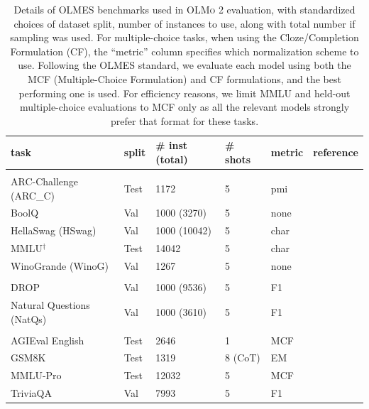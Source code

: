 \documentclass[table]{ai2style/ai2}
\newcommand{\olmotoo}{\textsc{OLMo 2}\xspace}
\begin{document}
\begin{table}[h]
  \centering

\begin{small}
\begin{tabular}{llllll}
\toprule
\bf{task} & \bf{split} & \bf{\# inst (total)} & \bf{\# shots} & \bf{metric} & \bf{reference}\\
\midrule
\rowcolor{midgrey}\multicolumn{6}{c}{\textbf{\textit{Multiple-choice tasks}}} \\
ARC-Challenge (ARC\_C) & Test &  1172 & 5 & pmi & \citep{clark2018think} \\
BoolQ & Val &  1000 (3270) & 5  & none & \citep{clark-etal-2019-boolq}\\
HellaSwag (HSwag) & Val &  1000 (10042) & 5 & char & \citep{zellers-etal-2019-hellaswag}\\
MMLU$^\dagger$ & Test &  14042 & 5 & char & \citep{hendryckstest2021}\\
WinoGrande (WinoG) & Val &  1267 &  5 & none & \citep{Sakaguchi_Le_Bras_Bhagavatula_Choi_2020}\\
\rowcolor{midgrey}\multicolumn{6}{c}{\textbf{\textit{Generative tasks}}} \\
DROP & Val &  1000 (9536) & 5 & F1 & \citep{dua-etal-2019-drop}\\
Natural Questions (NatQs) & Val &  1000 (3610) & 5 & F1 & \citep{kwiatkowski-etal-2019-natural} \\
\rowcolor{midgrey}\multicolumn{6}{c}{\textbf{\textit{Held-out tasks}}} \\
AGIEval English & Test &  2646 & 1 & MCF & \citep{zhong-etal-2024-agieval} \\
GSM8K & Test & 1319  & 8 (CoT) & EM & \citep{cobbe2021trainingverifierssolvemath}\\
MMLU-Pro & Test &  12032 & 5 & MCF & \citep{wang2024mmlu} \\
TriviaQA & Val &  7993 & 5 & F1 & \citep{joshi-etal-2017-triviaqa}\\
\bottomrule
\end{tabular}
\end{small}
  \caption{Details of OLMES benchmarks used in \olmotoo evaluation, with standardized choices of dataset split, number of instances to use, along with total number if sampling was used. For multiple-choice tasks, when using the Cloze/Completion Formulation (CF), the ``metric'' column specifies which normalization scheme to use. Following the OLMES standard, we evaluate each model using both the MCF (Multiple-Choice Formulation) and CF formulations, and the best performing one is used. For efficiency reasons, we limit MMLU and held-out multiple-choice evaluations to MCF only as all the relevant models strongly prefer that format for these tasks.}
  \label{tab:task-details}
\end{table}
\end{document}
